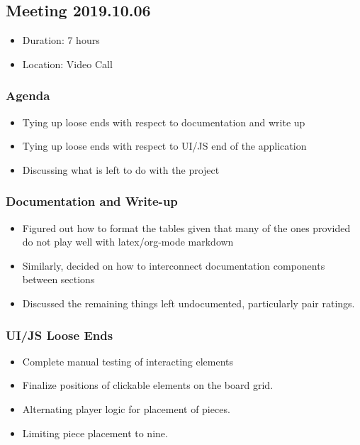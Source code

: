 \documentclass[11pt]{article}
\begin{document}
\subsection{Meeting 2019.10.06}
\label{sec:org6e39f56}
\begin{itemize}
\item Duration: 7 hours
\item Location: Video Call
\end{itemize}
\subsubsection*{Agenda}
\label{sec:orgd689f01}
\begin{itemize}
\item Tying up loose ends with respect to documentation and write up
\item Tying up loose ends with respect to UI/JS end of the application
\item Discussing what is left to do with the project
\end{itemize}
\subsubsection*{Documentation and Write-up}
\label{sec:orge8a992d}
\begin{itemize}
\item Figured out how to format the tables given that many of the ones provided do not play well
with latex/org-mode markdown
\item Similarly, decided on how to interconnect documentation components between sections
\item Discussed the remaining things left undocumented, particularly pair ratings.
\end{itemize}
\subsubsection*{UI/JS Loose Ends}
\label{sec:orgd90b063}
\begin{itemize}
\item Complete manual testing of interacting elements
\item Finalize positions of clickable elements on the board grid.
\item Alternating player logic for placement of pieces.
\item Limiting piece placement to nine.
\end{itemize}
\end{document}
